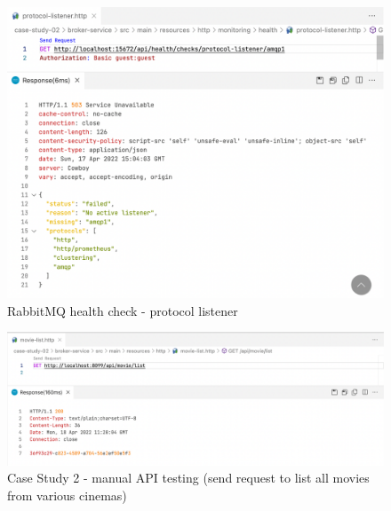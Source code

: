 \begin{figure}[H]
	\centering
	\includegraphics[width=1.0\linewidth]{./assets/images/case-studies/cs02-hc5.png}
	\caption{RabbitMQ health check - protocol listener}
	\label{fig:cs02-hc5}
\end{figure}


\begin{figure}[H]
	\centering
	\includegraphics[width=1.0\linewidth]{./assets/images/case-studies/cs02-manual-1.png}
	\caption{Case Study 2 - manual API testing (send request to list all movies from various cinemas)}
	\label{fig:cs02-manual-1}
\end{figure}

